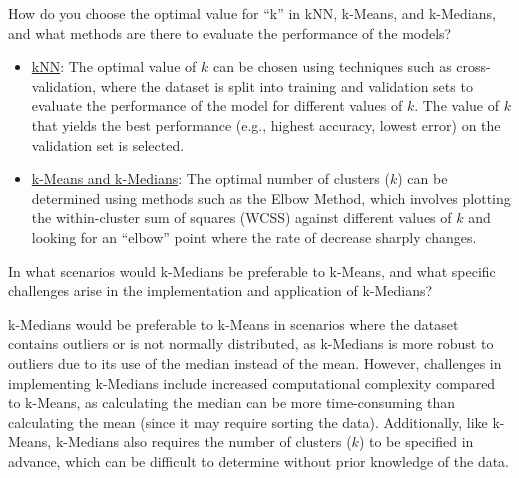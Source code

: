 \begin{ejercicio}
    How do you choose the optimal value for ``k'' in kNN, k-Means, and k-Medians, and what methods are there to evaluate the performance of the models?
    \begin{itemize}
        \item \ul{kNN}: The optimal value of $k$ can be chosen using techniques such as cross-validation, where the dataset is split into training and validation sets to evaluate the performance of the model for different values of $k$. The value of $k$ that yields the best performance (e.g., highest accuracy, lowest error) on the validation set is selected.

        \item \ul{k-Means and k-Medians}: The optimal number of clusters ($k$) can be determined using methods such as the Elbow Method, which involves plotting the within-cluster sum of squares (WCSS) against different values of $k$ and looking for an ``elbow'' point where the rate of decrease sharply changes.
    \end{itemize}
\end{ejercicio}
\begin{ejercicio}
    In what scenarios would k-Medians be preferable to k-Means, and what specific challenges arise in the implementation and application of k-Medians?
    
    k-Medians would be preferable to k-Means in scenarios where the dataset contains outliers or is not normally distributed, as k-Medians is more robust to outliers due to its use of the median instead of the mean. However, challenges in implementing k-Medians include increased computational complexity compared to k-Means, as calculating the median can be more time-consuming than calculating the mean (since it may require sorting the data). Additionally, like k-Means, k-Medians also requires the number of clusters ($k$) to be specified in advance, which can be difficult to determine without prior knowledge of the data.
\end{ejercicio}